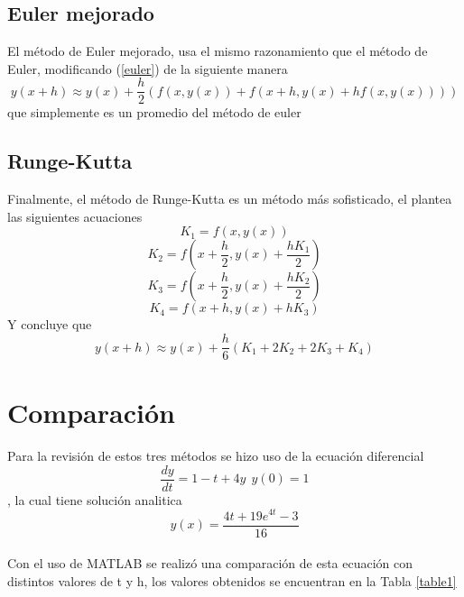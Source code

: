 \documentclass[12pt]{article}
\begin{document}
\subsection{Euler mejorado}
El método de Euler mejorado, usa el mismo razonamiento que el método de Euler, modificando (\ref{euler}) de la siguiente manera
\begin{equation}
y(x+h) \approx y(x)+\frac{h}{2}(f(x,y(x))+f(x+h,y(x)+hf(x,y(x))))
\label{euler_m}
\end{equation}
que simplemente es un promedio del método de euler
\subsection{Runge-Kutta}
Finalmente, el método de Runge-Kutta es un método más sofisticado, el plantea las siguientes acuaciones $$K_{1} = f(x,y(x))$$$$K_{2} = f(x+\frac{h}{2},y(x)+\frac{hK_{1}}{2})$$$$K_3= f(x+\frac{h}{2}, y(x)+\frac{hK_{2}}{2})$$$$K_{4} = f(x+h, y(x)+hK_{3})$$
Y concluye que 
\begin{equation}
y(x+h) \approx y(x)+\frac{h}{6}(K_{1}+2K_{2}+2K_{3}+K_{4})
\label{runge_kutta}
\end{equation}

\section{Comparación}
Para la revisión de estos tres métodos se hizo uso de la ecuación diferencial
\begin{equation}
\frac{dy}{dt} = 1-t+4y~~y(0) = 1
\label{problema1}
\end{equation}, la cual tiene solución analitica $$y(x) = \frac{4t+19e^{4t} -3}{16}$$\\
Con el uso de MATLAB se realizó una comparación de esta ecuación con distintos valores de t y h, los valores obtenidos se encuentran en la Tabla \ref{table1}
\end{document}
